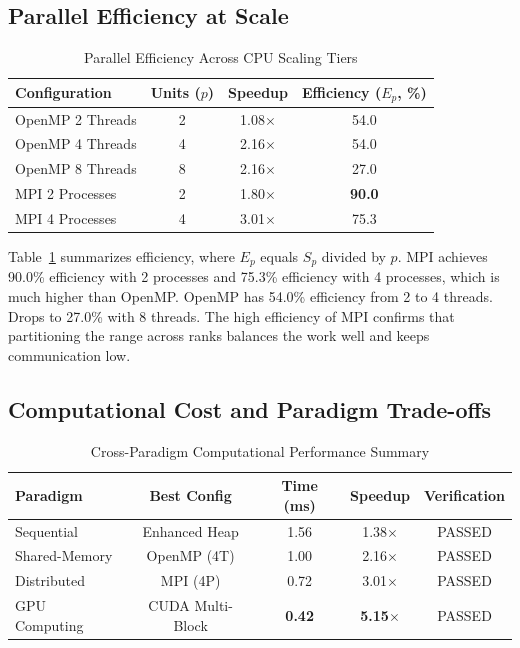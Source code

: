 \documentclass[conference]{IEEEtran}
\begin{document}
\subsection{Parallel Efficiency at Scale}
\begin{table}[!t]
\centering
\caption{Parallel Efficiency Across CPU Scaling Tiers}
\label{tab:efficiency}
\begin{tabular}{@{}lccc@{}}
\toprule
Configuration & Units ($p$) & Speedup & Efficiency ($E_p$, \%) \\
\midrule
OpenMP 2 Threads & 2 & 1.08$\times$ & 54.0 \\
OpenMP 4 Threads & 4 & 2.16$\times$ & 54.0 \\
OpenMP 8 Threads & 8 & 2.16$\times$ & 27.0 \\
MPI 2 Processes & 2 & 1.80$\times$ & \textbf{90.0} \\
MPI 4 Processes & 4 & 3.01$\times$ & 75.3 \\
\bottomrule
\end{tabular}
\end{table}

Table~\ref{tab:efficiency} summarizes efficiency, where $E_p$ equals $S_p$ divided by $p$. MPI achieves 90.0\% efficiency with 2 processes and 75.3\% efficiency with 4 processes, which is much higher than OpenMP. OpenMP has 54.0\% efficiency from 2 to 4 threads. Drops to 27.0\% with 8 threads. The high efficiency of MPI confirms that partitioning the range across ranks balances the work well and keeps communication low.

\subsection{Computational Cost and Paradigm Trade-offs}
\begin{table}[!t]
\centering
\caption{Cross-Paradigm Computational Performance Summary}
\label{tab:cost}
\begin{tabular}{@{}lcccc@{}}
\toprule
Paradigm & Best Config & Time (ms) & Speedup & Verification \\
\midrule
Sequential & Enhanced Heap & 1.56 & 1.38$\times$ & PASSED \\
Shared-Memory & OpenMP (4T) & 1.00 & 2.16$\times$ & PASSED \\
Distributed & MPI (4P) & 0.72 & 3.01$\times$ & PASSED \\
GPU Computing & CUDA Multi-Block & \textbf{0.42} & \textbf{5.15$\times$} & PASSED \\
\bottomrule
\end{tabular}
\end{table}
\end{document}
